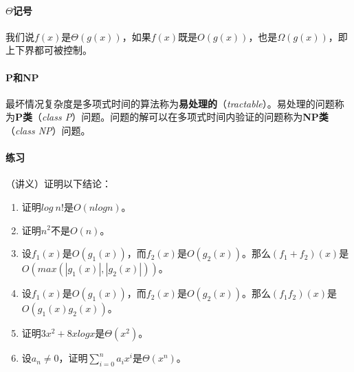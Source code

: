\documentclass[b5paper,oneside]{ctexbook}
\begin{document}
\paragraph{$\Theta$记号}我们说$f (x)$是$\Theta(g(x))$，如果$f(x)$既是$O(g(x))$，也是$\Omega(g(x))$，即上下界都可被控制。
\paragraph{P和NP}最坏情况复杂度是多项式时间的算法称为\textbf{易处理的}（\emph{tractable}）。易处理的问题称为\textbf{P类}（\textit{class P}）问题。问题的解可以在多项式时间内验证的问题称为\textbf{NP类}（\textit{class NP}）问题。
\paragraph{练习}（讲义）证明以下结论：
  \begin{enumerate}
 \item 证明$\mathit{log}\ n!$是$O(n \mathit{log} n)$。
  \item 证明$n^2$不是$O(n)$。
 \item 设$f_1(x)$是$O(g_1(x))$，而$f_2(x)$是$O(g_2(x))$。那么$(f_1+f_2)(x)$是$O(max(|g_1(x)|, |g_2(x)|))$。
  \item 设$f_1(x)$是$O(g_1(x))$，而$f_2(x)$是$O(g_2(x))$。那么$(f_1f_2)(x)$是$O(g_1(x)g_2(x))$。
  \item 证明$3x^2 + 8x \mathit{log} x$是$\Theta(x^2)$。
  \item 设$a_n\neq 0$，证明$\sum_{i=0}^n a_i x^i$是$\Theta(x^n)$。
  \end{enumerate}
\end{document}
